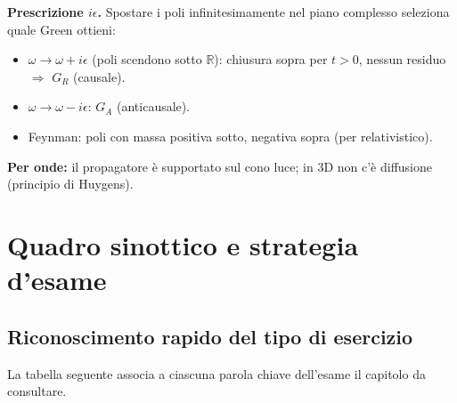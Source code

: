 \documentclass[11pt,a4paper,openany]{book}
\theoremstyle{definition}
\newcommand{\R}{\mathbb{R}}
\begin{document}
\begin{trucco}
\textbf{Prescrizione $i\epsilon$.} Spostare i poli infinitesimamente nel piano complesso seleziona quale Green ottieni:
\begin{itemize}
\item $\omega\to\omega+i\epsilon$ (poli scendono sotto $\R$): chiusura sopra per $t>0$, nessun residuo $\Rightarrow$ $G_R$ (causale).
\item $\omega\to\omega-i\epsilon$: $G_A$ (anticausale).
\item Feynman: poli con massa positiva sotto, negativa sopra (per relativistico).
\end{itemize}
\textbf{Per onde:} il propagatore \`e supportato sul cono luce; in 3D non c'\`e diffusione (principio di Huygens).
\end{trucco}

\chapter{Quadro sinottico e strategia d'esame}

\section{Riconoscimento rapido del tipo di esercizio}
La tabella seguente associa a ciascuna parola chiave dell'esame il capitolo da consultare.
\end{document}
